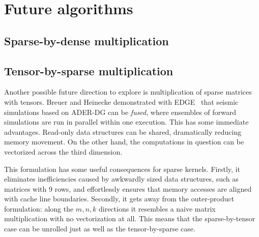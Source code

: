\section{Future algorithms}

\subsection{Sparse-by-dense multiplication}



\subsection{Tensor-by-sparse multiplication}

Another possible future direction to explore is multiplication of sparse matrices with tensors. Breuer and Heinecke demonstrated with EDGE~\cite{10.1007/978-3-319-58667-0_3} that seismic simulations based on ADER-DG can be \emph{fused}, where ensembles of forward simulations are run in parallel within one execution. This has some immediate advantages. Read-only data structures can be shared, dramatically reducing memory movement. On the other hand, the computations in question can be vectorized across the third dimension.

This formulation has some useful consequences for sparse kernels. Firstly, it eliminates inefficiencies caused by awkwardly sized data structures, such as matrices with 9 rows, and effortlessly ensures that memory accesses are aligned with cache line boundaries. Secondly, it gets away from the outer-product formulation: along the $m,n,k$ directions it resembles a naive matrix multiplication with no vectorization at all. This means that the sparse-by-tensor case can be unrolled just as well as the tensor-by-sparse case. 




